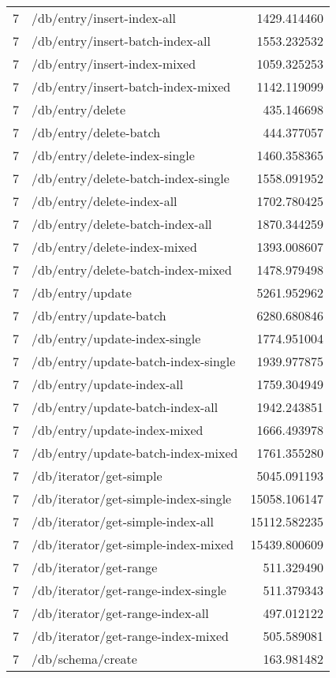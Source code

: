 \begin{longtable}{rlr}
7 & /db/entry/insert-index-all & 1429.414460 \\
7 & /db/entry/insert-batch-index-all & 1553.232532 \\
7 & /db/entry/insert-index-mixed & 1059.325253 \\
7 & /db/entry/insert-batch-index-mixed & 1142.119099 \\
7 & /db/entry/delete & 435.146698 \\
7 & /db/entry/delete-batch & 444.377057 \\
7 & /db/entry/delete-index-single & 1460.358365 \\
7 & /db/entry/delete-batch-index-single & 1558.091952 \\
7 & /db/entry/delete-index-all & 1702.780425 \\
7 & /db/entry/delete-batch-index-all & 1870.344259 \\
7 & /db/entry/delete-index-mixed & 1393.008607 \\
7 & /db/entry/delete-batch-index-mixed & 1478.979498 \\
7 & /db/entry/update & 5261.952962 \\
7 & /db/entry/update-batch & 6280.680846 \\
7 & /db/entry/update-index-single & 1774.951004 \\
7 & /db/entry/update-batch-index-single & 1939.977875 \\
7 & /db/entry/update-index-all & 1759.304949 \\
7 & /db/entry/update-batch-index-all & 1942.243851 \\
7 & /db/entry/update-index-mixed & 1666.493978 \\
7 & /db/entry/update-batch-index-mixed & 1761.355280 \\
7 & /db/iterator/get-simple & 5045.091193 \\
7 & /db/iterator/get-simple-index-single & 15058.106147 \\
7 & /db/iterator/get-simple-index-all & 15112.582235 \\
7 & /db/iterator/get-simple-index-mixed & 15439.800609 \\
7 & /db/iterator/get-range & 511.329490 \\
7 & /db/iterator/get-range-index-single & 511.379343 \\
7 & /db/iterator/get-range-index-all & 497.012122 \\
7 & /db/iterator/get-range-index-mixed & 505.589081 \\
7 & /db/schema/create & 163.981482 \\

\end{longtable}
